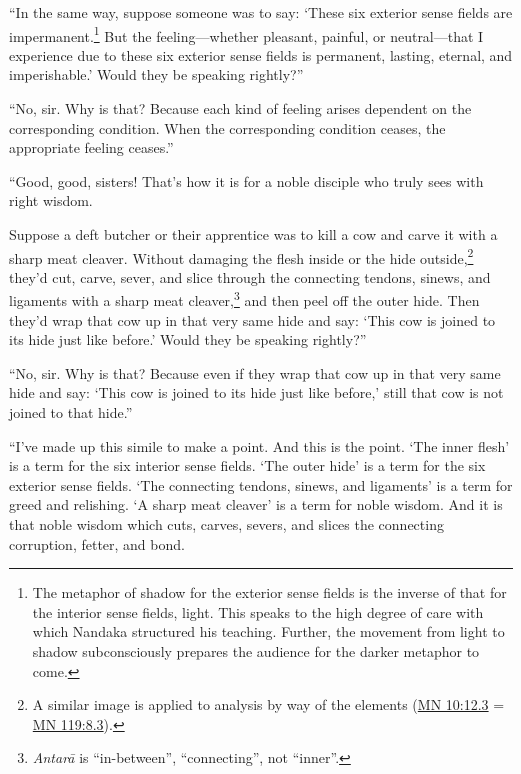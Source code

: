 \documentclass[12pt,openany]{book}%
\begin{document}
“In the same way, suppose someone was to say: ‘These six exterior sense fields are impermanent.\footnote{The metaphor of shadow for the exterior sense fields is the inverse of that for the interior sense fields, light. This speaks to the high degree of care with which Nandaka structured his teaching. Further, the movement from light to shadow subconsciously prepares the audience for the darker metaphor to come. } But the feeling—whether pleasant, painful, or neutral—that I experience due to these six exterior sense fields is permanent, lasting, eternal, and imperishable.’ Would they be speaking rightly?” 

“No, sir. Why is that? Because each kind of feeling arises dependent on the corresponding condition. When the corresponding condition ceases, the appropriate feeling ceases.” 

“Good, good, sisters! That’s how it is for a noble disciple who truly sees with right wisdom. 

Suppose a deft butcher or their apprentice was to kill a cow and carve it with a sharp meat cleaver. Without damaging the flesh inside or the hide outside,\footnote{A similar image is applied to analysis by way of the elements (\href{https://suttacentral.net/mn10/en/sujato\#12.3}{MN 10:12.3} = \href{https://suttacentral.net/mn119/en/sujato\#8.3}{MN 119:8.3}). } they’d cut, carve, sever, and slice through the connecting tendons, sinews, and ligaments with a sharp meat cleaver,\footnote{\textit{\textsanskrit{Antarā}} is “in-between”, “connecting”, not “inner”. } and then peel off the outer hide. Then they’d wrap that cow up in that very same hide and say: ‘This cow is joined to its hide just like before.’ Would they be speaking rightly?” 

“No, sir. Why is that? Because even if they wrap that cow up in that very same hide and say: ‘This cow is joined to its hide just like before,’ still that cow is not joined to that hide.” 

“I’ve made up this simile to make a point. And this is the point. ‘The inner flesh’ is a term for the six interior sense fields. ‘The outer hide’ is a term for the six exterior sense fields. ‘The connecting tendons, sinews, and ligaments’ is a term for greed and relishing. ‘A sharp meat cleaver’ is a term for noble wisdom. And it is that noble wisdom which cuts, carves, severs, and slices the connecting corruption, fetter, and bond. 
\end{document}
